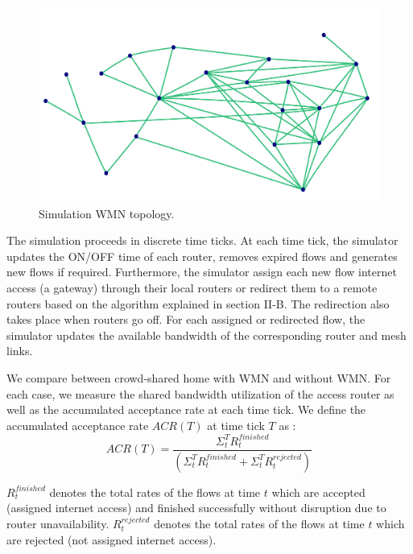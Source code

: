 \begin{figure}[t]
\begin{center}
\includegraphics[width=1\linewidth]{topology.pdf}
\caption{Simulation WMN topology.}
\label{fig:topology}
\end{center}
\end{figure}

The simulation proceeds in discrete time ticks. At each time tick, the simulator updates the ON/OFF time of each router, removes expired flows and generates new flows if required. Furthermore, the simulator assign each new flow internet access (a gateway) through their local routers or redirect them to a remote routers based on the algorithm explained in section II-B. The redirection also takes place when routers go off. For each assigned or redirected flow, the simulator updates the available bandwidth of the corresponding router and mesh links.

We compare between crowd-shared home with WMN and without WMN. For each case, we measure the shared bandwidth utilization of the access router as well as the accumulated acceptance rate at each time tick. We define the accumulated acceptance rate $ACR(T)$ at time tick $T$ as :
\vspace{-3mm}
\begin{equation}\label{1}
ACR(T)= \frac{\Sigma^T_t R^{finished}_{t}}{(\Sigma^T_t R^{finished}_{t} + \Sigma^T_t R^{rejected}_{t})}
\end{equation}
\vspace{-2mm}

$R^{finished}_{t}$ denotes the total rates of the flows at time $t$ which are accepted (assigned internet access) and finished successfully without disruption due to router unavailability. $R^{rejected}_{t}$ denotes the total rates of the flows at time $t$ which are rejected (not assigned internet access). 

